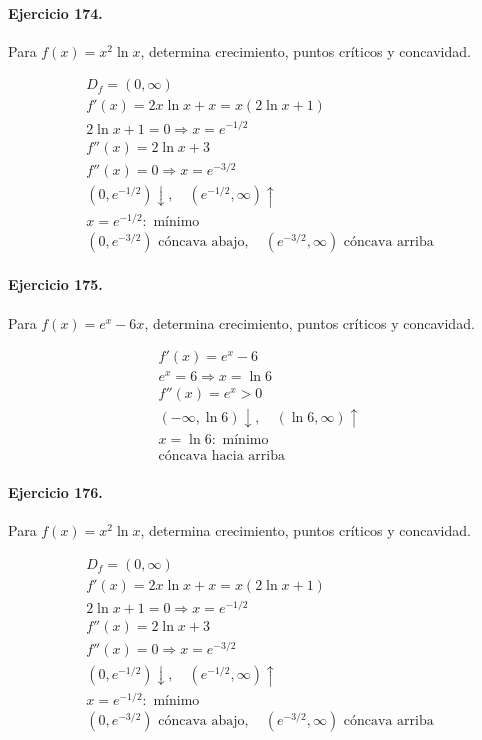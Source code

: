 \documentclass[11pt,a4paper]{article}
\begin{document}
\paragraph{Ejercicio 174.} Para $f(x)=x^2\ln x$, determina crecimiento, puntos críticos y concavidad.

\[
\begin{aligned}
D_f=(0,\infty)\\
f'(x)=2x\ln x+x=x(2\ln x+1)\\
2\ln x+1=0\Rightarrow x=e^{-1/2}\\
f''(x)=2\ln x+3\\
f''(x)=0\Rightarrow x=e^{-3/2}\\
(0,e^{-1/2})\downarrow,\quad(e^{-1/2},\infty)\uparrow\\
x=e^{-1/2}:\text{{ mínimo}}\\
(0,e^{-3/2})\text{{ cóncava abajo}},\quad(e^{-3/2},\infty)\text{{ cóncava arriba}}
\end{aligned}
\]


\paragraph{Ejercicio 175.} Para $f(x)=e^x-6x$, determina crecimiento, puntos críticos y concavidad.

\[
\begin{aligned}
f'(x)=e^x-6\\
e^x=6\Rightarrow x=\ln 6\\
f''(x)=e^x>0\\
(-\infty,\ln 6)\downarrow,\quad(\ln 6,\infty)\uparrow\\
x=\ln 6:\text{ mínimo}\\
\text{{cóncava hacia arriba}}
\end{aligned}
\]


\paragraph{Ejercicio 176.} Para $f(x)=x^2\ln x$, determina crecimiento, puntos críticos y concavidad.

\[
\begin{aligned}
D_f=(0,\infty)\\
f'(x)=2x\ln x+x=x(2\ln x+1)\\
2\ln x+1=0\Rightarrow x=e^{-1/2}\\
f''(x)=2\ln x+3\\
f''(x)=0\Rightarrow x=e^{-3/2}\\
(0,e^{-1/2})\downarrow,\quad(e^{-1/2},\infty)\uparrow\\
x=e^{-1/2}:\text{{ mínimo}}\\
(0,e^{-3/2})\text{{ cóncava abajo}},\quad(e^{-3/2},\infty)\text{{ cóncava arriba}}
\end{aligned}
\]
\end{document}
